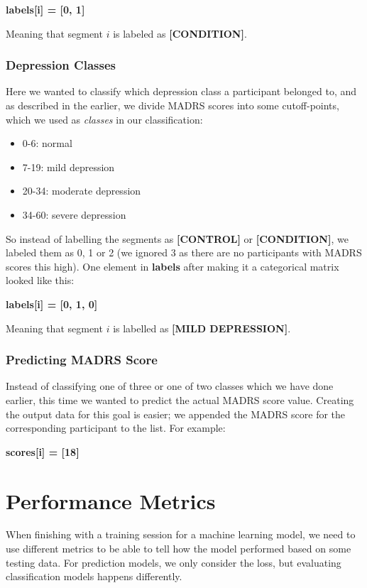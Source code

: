 \textbf{labels[i] = [0, 1]}

\noindent Meaning that segment $i$ is labeled as \textbf{[CONDITION]}.

\subsubsection{Depression Classes}
Here we wanted to classify which depression class a participant belonged to, and as described in the earlier, we divide MADRS scores into some cutoff-points, which we used as \textit{classes} in our classification:

\begin{itemize}
  \item 0-6: normal
  \item 7-19: mild depression
  \item 20-34: moderate depression
  \item 34-60: severe depression
\end{itemize}

So instead of labelling the segments as \textbf{[CONTROL]} or \textbf{[CONDITION]}, we labeled them as 0, 1 or 2 (we ignored 3 as there are no participants with MADRS scores this high). One element in \textbf{labels} after making it a categorical matrix looked like this:

\textbf{labels[i] = [0, 1, 0]}

\noindent Meaning that segment $i$ is labelled as \textbf{[MILD DEPRESSION]}.

\subsubsection{Predicting MADRS Score}

Instead of classifying one of three or one of two classes which we have done earlier, this time we wanted to predict the actual MADRS score value. Creating the output data for this goal is easier; we appended the MADRS score for the corresponding participant to the list. For example:

\textbf{scores[i] = [18]}

\section{Performance Metrics}

When finishing with a training session for a machine learning model, we need to use different metrics to be able to tell how the model performed based on some testing data. For prediction models, we only consider the loss, but evaluating classification models happens differently. 

